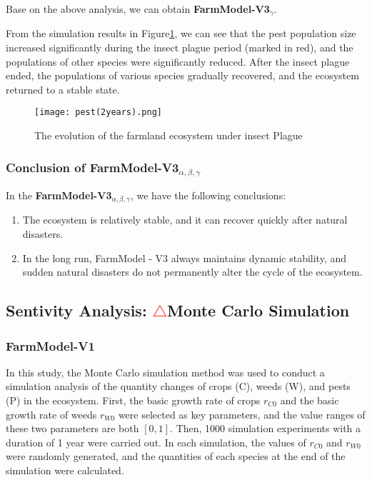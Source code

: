 \documentclass[12pt]{article}  %
\begin{document}
Base on the above analysis, we can obtain \textbf{FarmModel-V3$_{\gamma}$}.

From the simulation results in Figure\ref{fig:Insect Plague Influence}, we can 
see that the pest population size increased significantly during the insect
plague period (marked in red), and the populations of other species were
significantly reduced. After the insect plague ended, the populations of
various species gradually recovered, and the ecosystem returned to a stable state.

\begin{figure}[h]
    \centering
        \texttt{[image: pest(2years).png]}
        \label{subfig:3-2(2years)}
    \caption{ The evolution of the farmland ecosystem under insect Plague}\label{fig:Insect Plague Influence}
    \end{figure}

\subsubsection{Conclusion of FarmModel-V3$_{\alpha,\beta,\gamma}$}
In the \textbf{FarmModel-V3$_{\alpha,\beta,\gamma}$}, we have the following conclusions:
\begin{enumerate}
    \item The ecosystem is relatively stable, and it can recover quickly after natural disasters.
    \item In the long run, FarmModel - V3 always maintains dynamic stability,
    and sudden natural disasters do not permanently alter the cycle of the
     ecosystem.
\end{enumerate}
    
\subsection{Sentivity Analysis: \textbf{\textcolor{red}{$\triangle$}Monte Carlo Simulation}}

\subsubsection{FarmModel-V1}
In this study, the Monte Carlo simulation method was used to conduct a simulation analysis of the quantity changes of crops (C), weeds (W), and pests (P) in the ecosystem. First, the basic growth rate of crops \(r_{C0}\) and the basic growth rate of weeds \(r_{W0}\) were selected as key parameters, and the value ranges of these two parameters are both \([0, 1]\). Then, 1000 simulation experiments with a duration of 1 year were carried out. In each simulation, the values of \(r_{C0}\) and \(r_{W0}\) were randomly generated, and the quantities of each species at the end of the simulation were calculated.
\end{document}
